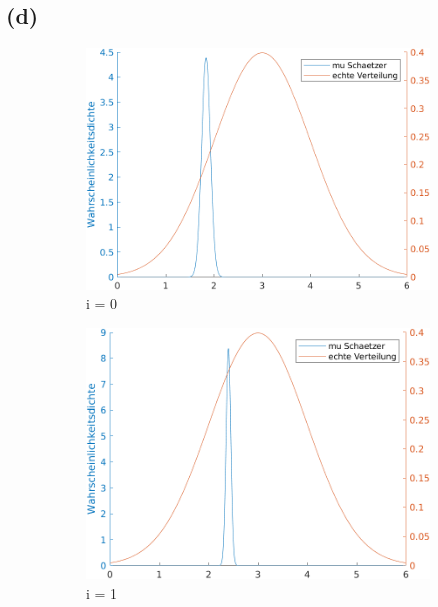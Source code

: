 \documentclass[a4paper]{scrartcl}
\begin{document}
\subsection*{(d)}
	\begin{figure}[H]
		\centering
		\begin{subfigure}{.5\textwidth}
			\centering
			\includegraphics*[scale = 0.4]{assignment3_data/plots/q3_i0}
			\caption*{i = 0}
		\end{subfigure}%
		\begin{subfigure}{.5\textwidth}
			\centering
			\includegraphics*[scale = 0.4]{assignment3_data/plots/q3_i1}
			\caption*{i = 1}
		\end{subfigure}
		\begin{subfigure}{.5\textwidth}
			\centering

\end{subfigure}
\end{figure}
\end{document}
